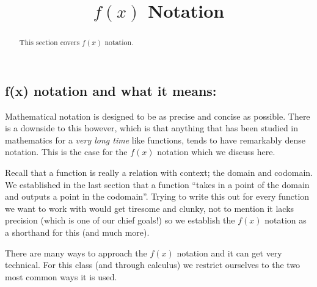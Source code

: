\documentclass{ximeraXloud}
\title{$f(x)$ Notation}
\begin{document}
\begin{abstract}
    This section covers $f(x)$ notation.
\end{abstract}
\maketitle


\subsection*{\textbf{f(x) notation and what it means:}}

    Mathematical notation is designed to be as precise and concise as possible. There is a downside to this however, which is that anything that has been studied in mathematics for a \textit{very long time} like functions, tends to have remarkably dense notation. This is the case for the $f(x)$ notation which we discuss here.
    
    Recall that a function is really a relation with context; the domain and codomain. We established in the last section that a function ``takes in a point of the domain and outputs a point in the codomain''. Trying to write this out for every function we want to work with would get tiresome and clunky, not to mention it lacks precision (which is one of our chief goals!) so we establish the $f(x)$ notation as a shorthand for this (and much more).
    
    There are many ways to approach the $f(x)$ notation and it can get very technical. For this class (and through calculus) we restrict ourselves to the two most common ways it is used.
    
\end{document}
